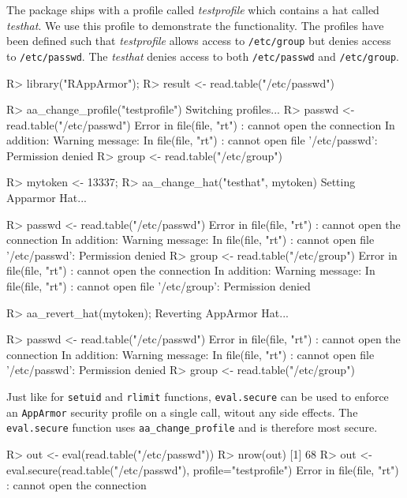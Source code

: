 \documentclass{jss}
\newcommand{\AppArmor}{\texttt{AppArmor}\xspace}
\newcommand{\RAppArmor}{\pkg{RAppArmor}\xspace}
\begin{document}
The \RAppArmor package ships with a profile called \emph{testprofile} which
contains a hat called \emph{testhat}. We use this profile to demonstrate the
functionality. The profiles have been defined such that \emph{testprofile}
allows access to \texttt{/etc/group} but denies access to \texttt{/etc/passwd}.
The \emph{testhat} denies access to both \texttt{/etc/passwd} and
\texttt{/etc/group}.

\begin{CodeChunk}
\begin{CodeInput}
R> library("RAppArmor");
R> result <- read.table("/etc/passwd")

R> aa_change_profile("testprofile")
Switching profiles...
R> passwd <- read.table("/etc/passwd")
Error in file(file, "rt") : cannot open the connection
In addition: Warning message:
In file(file, "rt") : cannot open file '/etc/passwd': Permission denied
R> group <- read.table("/etc/group")

R> mytoken <- 13337;
R> aa_change_hat("testhat", mytoken)
Setting Apparmor Hat...

R> passwd <- read.table("/etc/passwd")
Error in file(file, "rt") : cannot open the connection
In addition: Warning message:
In file(file, "rt") : cannot open file '/etc/passwd': Permission denied
R> group <- read.table("/etc/group")
Error in file(file, "rt") : cannot open the connection
In addition: Warning message:
In file(file, "rt") : cannot open file '/etc/group': Permission denied

R> aa_revert_hat(mytoken);
Reverting AppArmor Hat...

R> passwd <- read.table("/etc/passwd")
Error in file(file, "rt") : cannot open the connection
In addition: Warning message:
In file(file, "rt") : cannot open file '/etc/passwd': Permission denied
R> group <- read.table("/etc/group")
\end{CodeInput}
\end{CodeChunk}

Just like for \texttt{setuid} and \texttt{rlimit} functions,
\texttt{eval.secure} can be used to enforce an \AppArmor security profile on a
single call, witout any side effects. The \texttt{eval.secure} function uses
\texttt{aa\_change\_profile} and is therefore most secure.

\begin{CodeChunk}
\begin{CodeInput}
R> out <- eval(read.table("/etc/passwd"))
R> nrow(out)
[1] 68
R> out <- eval.secure(read.table("/etc/passwd"), profile="testprofile")
Error in file(file, "rt") : cannot open the connection
\end{CodeInput}
\end{CodeChunk}
\end{document}
